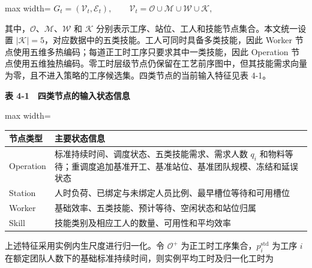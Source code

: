 \documentclass[journal,10pt]{IEEEtran}
\renewcommand{\arraystretch}{1.08}
\begin{document}
\begin{center}
\begin{adjustbox}{max width=\columnwidth}
$\displaystyle
G_t=(\mathcal{V}_t,\mathcal{E}_t),
\qquad
\mathcal{V}_t=\mathcal{O}\cup\mathcal{M}\cup\mathcal{W}\cup\mathcal{K},
$
\end{adjustbox}
\end{center}

其中，\(\mathcal{O}\)、\(\mathcal{M}\)、\(\mathcal{W}\) 和 \(\mathcal{K}\) 分别表示工序、站位、工人和技能节点集合。本文统一设置 \(|\mathcal{K}|=5\)，对应数据中的五类技能。工人可同时具备多类技能，因此 Worker 节点使用五维多热编码；每道正工时工序只要求其中一类技能，因此 Operation 节点使用五维独热编码。零工时层级节点仍保留在工艺前序图中，但其技能需求向量为零，且不进入策略的工序候选集。四类节点的当前输入特征见表 4-1。

\begin{table}[!t]
\centering
\footnotesize
\textbf{表 4-1　四类节点的输入状态信息}\par\smallskip
\setlength{\tabcolsep}{2.5pt}
\renewcommand{\arraystretch}{1.08}
\begin{adjustbox}{max width=\columnwidth}
\begin{tabular}{@{}
  >{\raggedright\arraybackslash}p{}
  >{\raggedright\arraybackslash}p{}@{}}
\toprule
\begin{minipage}[b]{\linewidth}\raggedright
节点类型
\end{minipage} & \begin{minipage}[b]{\linewidth}\raggedright
主要状态信息
\end{minipage} \\
\midrule
Operation & 标准持续时间、调度状态、五类技能需求、需求人数 \(q_i\) 和物料等待；重调度追加基准开工、基准站位、基准团队规模、冻结和延误状态 \\
Station & 人时负荷、已绑定与未绑定人员比例、最早槽位等待和可用槽位 \\
Worker & 基础效率、五类技能、预计等待、空闲状态和站位归属 \\
Skill & 技能类别及相应工人的数量、可用性和平均效率 \\
\bottomrule
\end{tabular}
\end{adjustbox}
\end{table}

上述特征采用实例内生尺度进行归一化。令 \(\mathcal{O}^{+}\) 为正工时工序集合，\(p_i^{\mathrm{std}}\) 为工序 \(i\) 在额定团队人数下的基础标准持续时间，则实例平均工时及归一化工时为
\end{document}
